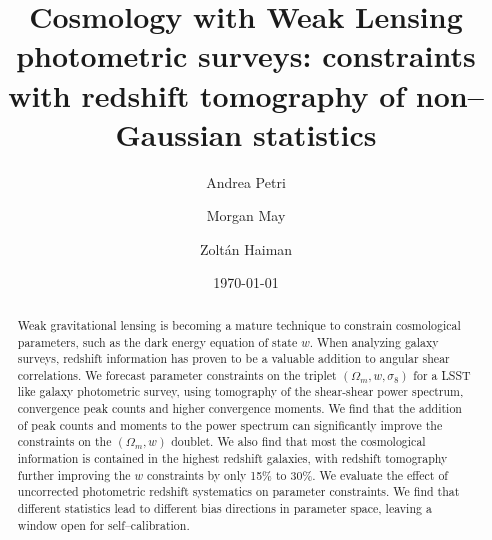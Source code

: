 \documentclass[reprint,aps,prd,superscriptaddress,showkeys,showpacs]{revtex4-1}
\begin{document}
\title{Cosmology with Weak Lensing photometric surveys: constraints with redshift tomography of non--Gaussian statistics}

\author{Andrea Petri}

\author{Morgan May}

\author{Zolt\'an Haiman}

\date{\today}

\label{firstpage}

\begin{abstract}
Weak gravitational lensing is becoming a mature technique to constrain cosmological parameters, such as the dark energy equation of state $w$. When analyzing galaxy surveys, redshift information has proven to be a valuable addition to angular shear correlations. We forecast parameter constraints on the triplet $(\Omega_m,w,\sigma_8)$ for a LSST like galaxy photometric survey, using tomography of the shear-shear power spectrum, convergence peak counts and higher convergence moments. We find that the addition of peak counts and moments to the power spectrum can significantly improve the constraints on the $(\Omega_m,w)$ doublet. We also find that most the cosmological information is contained in the highest redshift galaxies, with redshift tomography further improving the $w$ constraints by only 15\% to 30\%. We evaluate the effect of uncorrected photometric redshift systematics on parameter constraints. We find that different statistics lead to different bias directions in parameter space, leaving a window open for self--calibration. 
\end{abstract}



\maketitle


\end{document}
